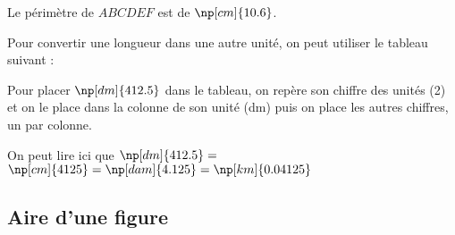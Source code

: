 \documentclass{classe-tex3R}
\begin{document}
\begin{exemple}
{\begin{minipage}{0.56\linewidth}
  Le périmètre de $ABCDEF$ est de $\np[cm]{10.6}$.
  \end{minipage}}\hfill%
\end{exemple}




\begin{methode}
  Pour convertir une longueur dans une autre unité, on peut utiliser le tableau suivant :

\sautdeligne

  \Tableau[Metre,NbLignes=1,Fleches]{}

\sautdeligne

\end{methode}


\sautdiapo

\begin{exemple}
Pour placer $\np[dm]{412.5}$ dans le tableau, on repère son chiffre des unités (2) et on le place dans la colonne de son unité (dm) puis on place les autres chiffres, un par colonne.


  On peut lire ici que $\np[dm]{412.5} =$ $ \np[cm]{4125} = \np[dam]{4.125} = \np[km]{0.04125}$

\end{exemple}

\sautfiche


\subsection{Aire d'une figure}
\end{document}
